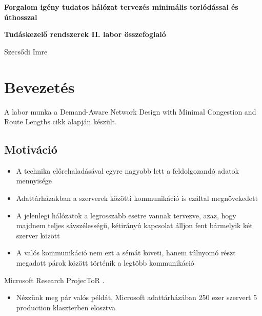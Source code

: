 \documentclass[12pt]{report}
\begin{document}
\begin{titlepage}
	\begin{center}
		\vspace*{1cm}
		
		\textbf{\LARGE 
			Forgalom igény tudatos hálózat tervezés minimális torlódással és úthosszal
		}
	
	
		\vspace{0.5cm}
	
		\textbf{\normalsize Tudáskezelő rendszerek II. labor összefoglaló}
		
		\vfill
		
		\Large Szecsődi Imre
		
		\vspace{2.8cm}
		
		\the\year
		
	\end{center}
\end{titlepage}

\tableofcontents
	
\chapter{Bevezetés}

A labor munka a Demand-Aware Network Design with Minimal Congestion and Route Lengths \cite{avin_demand-aware_nodate} cikk alapján készült.

\section{Motiváció}

\begin{itemize}
	\item A technika előrehaladásával egyre nagyobb lett a feldolgozandó adatok mennyisége
	\item Adattárházakban a szerverek közötti kommunikáció is ezáltal megnövekedett
	\item A jelenlegi hálózatok a legrosszabb esetre vannak tervezve, azaz, hogy majdnem teljes sávszélességű, kétirányú kapcsolat álljon fent bármelyik két szerver között
	\item A valós kommunikáció nem ezt a sémát követi, hanem túlnyomó részt megadott párok között történik a legtöbb kommunikáció
\end{itemize}

Microsoft Research ProjecToR \cite{ghobadi_projector:_2016}.

\begin{itemize}
	\item Nézzünk meg pár valós példát, Microsoft adattárházában  250 ezer szervert 5 production klaszterben elosztva
\end{itemize}
\end{document}
